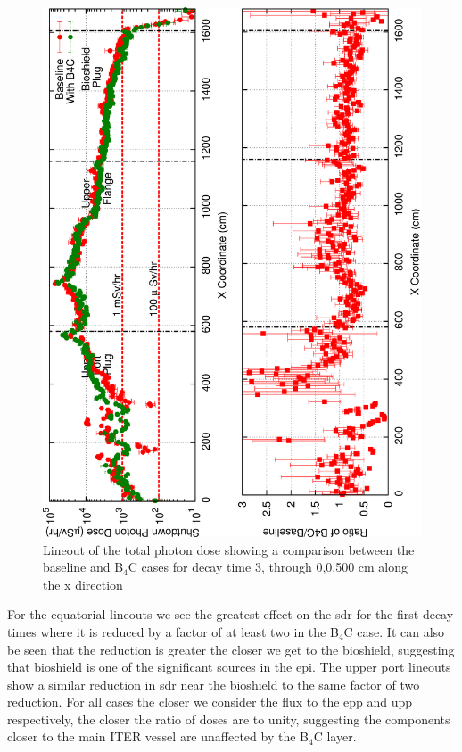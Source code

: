 \documentclass[12pt]{article}
\begin{document}
\begin{figure}[ht!]
\centering
\includegraphics[angle=-90,clip,scale=0.15]{../plots/photon_lineout/dc2_z700_lineout.png}
\caption{Lineout of the total photon dose showing a comparison between the baseline and B$_4$C cases for decay time 3,
                 through 0,0,500 cm along the x direction}
\label{fig:photons_dc3_total_dose_lineout_z700}
\end{figure}

\newpage
\clearpage
For the equatorial lineouts we see the greatest effect on the \gls{sdr} for 
the first decay times where it is reduced by a factor of at least two in the B$_4$C 
case. It can also be seen that the reduction is greater the closer we get to the 
bioshield, suggesting that bioshield is one of the significant sources in the 
\gls{epi}. The upper port lineouts show a similar reduction in \gls{sdr} near
the bioshield to the same factor of two reduction. For all cases the closer we
consider the flux to the \gls{epp} and \gls{upp} respectively, the closer the 
ratio of doses are to unity, suggesting the components closer to the main ITER
vessel are unaffected by the B$_4$C layer.
\end{document}
